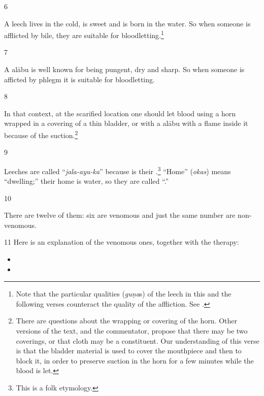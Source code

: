 \begin{translation}
\item[6]

\begin{sloka}
    A leech lives in the cold, is sweet and is born in the water. So when
someone is afflicted by bile, they are suitable for
bloodletting.\footnote{Note that the particular qualities (\emph{guṇa}s) of
    the leech in this and the following verses counteract the quality of the
    affliction.  See \cite[113, table 1]{broo-2018}.}
\end{sloka}

\item[7]

\begin{sloka}
    A \gls{alābu} is well known for being pungent, dry and sharp.  So
when someone is afficted by phlegm it is suitable for bloodletting.

\end{sloka}
\item[8]

In that context, at the scarified location one should let blood using a horn
wrapped in a covering of a thin bladder, or with a \gls{alābu} with a flame
inside it because of the suction.\footnote{There are questions about the
    wrapping or covering of the horn.  Other versions of the text, and the
    commentator, propose that there may be two coverings, or that cloth may be a
    constituent. 
    Our understanding of this verse is that the
    bladder material is used to cover the mouthpiece and then to block it, in
    order to preserve suction in the horn for a few minutes while the blood is
    let. }

\item[9]

Leeches are called “\emph{jala-ayu-ka}” because  is their
.\footnote{This is a folk etymology.} “Home” (\emph{okas})
    means “{dwelling};” their home is water, so they are called
    “.”

\item[10]

There are twelve of them: six are venomous and just the same number are 
non-venomous. 

\item[11]
Here is an explanation of the venomous ones, together with the therapy:
\begin{itemize}
    \item {}
    \item {}
    

\end{itemize}
\end{translation}
